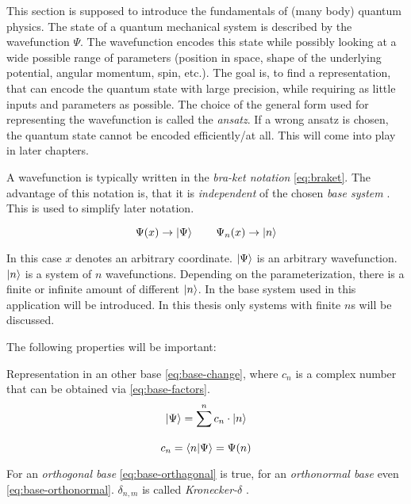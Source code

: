 This section is supposed to introduce the fundamentals of (many body) quantum physics.
The state of a quantum mechanical system is described by the wavefunction $\Psi$. 
The wavefunction encodes this state while possibly looking at a wide possible range of parameters (position in space, shape of the underlying potential, angular momentum, spin, etc.).
The goal is, to find a representation, that can encode the quantum state with large precision, while requiring as little inputs and parameters as possible. The choice of the general form used for representing the wavefunction is called the \emph{ansatz}. 
If a wrong ansatz is chosen, the quantum state cannot be encoded efficiently/at all. This will come into play in later chapters.

A wavefunction is typically written in the \emph{bra-ket notation} \ref{eq:braket}. The advantage of this notation is, that it is \emph{independent} of the chosen \emph{base system} \cite[]{schwablQM}. This is used to simplify later notation.  

\begin{equation}
    \label{eq:braket}
    \Psi(x) \rightarrow \ket{\Psi} \qquad \Psi_n(x) \rightarrow \ket{n}
\end{equation}

In this case $x$ denotes an arbitrary coordinate. $\ket{\Psi}$ is an arbitrary wavefunction. $\ket{n}$ is a system of $n$ wavefunctions. Depending on the parameterization, there is a finite or infinite amount of different $\ket{n}$. In  the base system used in this application will be introduced. In this thesis only systems with finite $n$s will be discussed.

The following properties will be important:

Representation in an other base \ref{eq:base-change}, where $c_n$ is a complex number that can be obtained via \ref{eq:base-factors}.
\begin{equation}
    \label{eq:base-change}
    \ket{\Psi} = \sum\limits_{}^{n} c_n \cdot \ket{n}
\end{equation}
\begin{equation}
    \label{eq:base-factors}
    c_n = \bra{n}\ket{\Psi} = \Psi(n)
\end{equation}

For an \emph{orthogonal base} \ref{eq:base-orthagonal} is true, for an \emph{orthonormal base} even \ref{eq:base-orthonormal}. $\delta_{n, m}$ is called \emph{Kronecker-$\delta$} \cite{schwablQM}.

